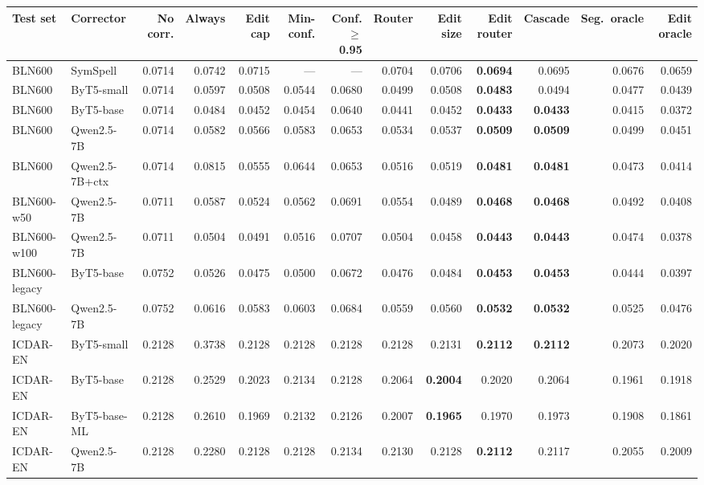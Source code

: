 \begin{tabular}{llrrrrrrrrrrr}
\toprule
Test set & Corrector & No corr. & Always & Edit cap & Min-conf. & Conf.$\ge$0.95 & Router & Edit size & Edit router & Cascade & Seg.\ oracle & Edit oracle \\
\midrule
BLN600 & SymSpell & 0.0714 & 0.0742 & 0.0715 & — & — & 0.0704 & 0.0706 & \textbf{0.0694} & 0.0695 & 0.0676 & 0.0659 \\
BLN600 & ByT5-small & 0.0714 & 0.0597 & 0.0508 & 0.0544 & 0.0680 & 0.0499 & 0.0508 & \textbf{0.0483} & 0.0494 & 0.0477 & 0.0439 \\
BLN600 & ByT5-base & 0.0714 & 0.0484 & 0.0452 & 0.0454 & 0.0640 & 0.0441 & 0.0452 & \textbf{0.0433} & \textbf{0.0433} & 0.0415 & 0.0372 \\
BLN600 & Qwen2.5-7B & 0.0714 & 0.0582 & 0.0566 & 0.0583 & 0.0653 & 0.0534 & 0.0537 & \textbf{0.0509} & \textbf{0.0509} & 0.0499 & 0.0451 \\
BLN600 & Qwen2.5-7B+ctx & 0.0714 & 0.0815 & 0.0555 & 0.0644 & 0.0653 & 0.0516 & 0.0519 & \textbf{0.0481} & \textbf{0.0481} & 0.0473 & 0.0414 \\
BLN600-w50 & Qwen2.5-7B & 0.0711 & 0.0587 & 0.0524 & 0.0562 & 0.0691 & 0.0554 & 0.0489 & \textbf{0.0468} & \textbf{0.0468} & 0.0492 & 0.0408 \\
BLN600-w100 & Qwen2.5-7B & 0.0711 & 0.0504 & 0.0491 & 0.0516 & 0.0707 & 0.0504 & 0.0458 & \textbf{0.0443} & \textbf{0.0443} & 0.0474 & 0.0378 \\
BLN600-legacy & ByT5-base & 0.0752 & 0.0526 & 0.0475 & 0.0500 & 0.0672 & 0.0476 & 0.0484 & \textbf{0.0453} & \textbf{0.0453} & 0.0444 & 0.0397 \\
BLN600-legacy & Qwen2.5-7B & 0.0752 & 0.0616 & 0.0583 & 0.0603 & 0.0684 & 0.0559 & 0.0560 & \textbf{0.0532} & \textbf{0.0532} & 0.0525 & 0.0476 \\
\addlinespace[2pt]
ICDAR-EN & ByT5-small & 0.2128 & 0.3738 & 0.2128 & 0.2128 & 0.2128 & 0.2128 & 0.2131 & \textbf{0.2112} & \textbf{0.2112} & 0.2073 & 0.2020 \\
\addlinespace[2pt]
ICDAR-EN & ByT5-base & 0.2128 & 0.2529 & 0.2023 & 0.2134 & 0.2128 & 0.2064 & \textbf{0.2004} & 0.2020 & 0.2064 & 0.1961 & 0.1918 \\
\addlinespace[2pt]
ICDAR-EN & ByT5-base-ML & 0.2128 & 0.2610 & 0.1969 & 0.2132 & 0.2126 & 0.2007 & \textbf{0.1965} & 0.1970 & 0.1973 & 0.1908 & 0.1861 \\
\addlinespace[2pt]
ICDAR-EN & Qwen2.5-7B & 0.2128 & 0.2280 & 0.2128 & 0.2128 & 0.2134 & 0.2130 & 0.2128 & \textbf{0.2112} & 0.2117 & 0.2055 & 0.2009 \\

\end{tabular}
